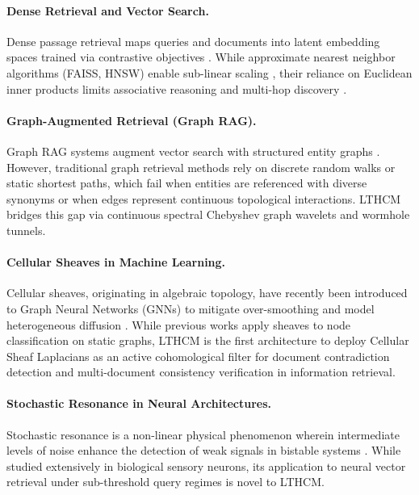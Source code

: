 \documentclass[11pt,a4paper]{article}
\begin{document}
\paragraph{Dense Retrieval and Vector Search.} Dense passage retrieval maps queries and documents into latent embedding spaces trained via contrastive objectives \cite{karpukhin2020dense,khattab2020colbert}. While approximate nearest neighbor algorithms (FAISS, HNSW) enable sub-linear scaling \cite{malkov2018efficient,johnson2019billion}, their reliance on Euclidean inner products limits associative reasoning and multi-hop discovery \cite{thakur2021beir}.

\paragraph{Graph-Augmented Retrieval (Graph RAG).} Graph RAG systems augment vector search with structured entity graphs \cite{edge2024graphrag}. However, traditional graph retrieval methods rely on discrete random walks or static shortest paths, which fail when entities are referenced with diverse synonyms or when edges represent continuous topological interactions. LTHCM bridges this gap via continuous spectral Chebyshev graph wavelets and wormhole tunnels.

\paragraph{Cellular Sheaves in Machine Learning.} Cellular sheaves, originating in algebraic topology, have recently been introduced to Graph Neural Networks (GNNs) to mitigate over-smoothing and model heterogeneous diffusion \cite{bodnar2022neural,hansen2019toward}. While previous works apply sheaves to node classification on static graphs, LTHCM is the first architecture to deploy Cellular Sheaf Laplacians as an active cohomological filter for document contradiction detection and multi-document consistency verification in information retrieval.

\paragraph{Stochastic Resonance in Neural Architectures.} Stochastic resonance is a non-linear physical phenomenon wherein intermediate levels of noise enhance the detection of weak signals in bistable systems \cite{gammaitoni1998stochastic,mcdonnell2009stochastic}. While studied extensively in biological sensory neurons, its application to neural vector retrieval under sub-threshold query regimes is novel to LTHCM.
\end{document}
